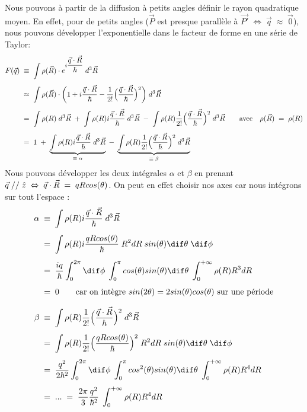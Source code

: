 Nous pouvons à partir de la diffusion à petits angles définir le rayon quadratique moyen. En effet, pour de petits angles ($\vec{P}$ est presque parallèle à $\vec{P'} \; \Leftrightarrow \; \vec{q}\;\approx\;\vec{0}$), nous pouvons développer l'exponentielle dans le facteur de forme en une série de Taylor:
\begin{align*}
    F(\vec{q}) &\;\equiv\;
    \int \rho(\vec{R}) \cdot e^{i\dfrac{\vec{q} \cdot \vec{R}}{\hbar}} \; d^3\vec{R}\\[4pt]
    &\;\approx\;
    \int \rho(\vec{R}) \cdot \bigg( 
    1 + i\dfrac{\vec{q}\cdot\vec{R}}{\hbar} - \dfrac{1}{2!} \Big( \dfrac{\vec{q}\cdot\vec{R}}{\hbar}\Big)^2
    \bigg) \; d^3\vec{R}\\[4pt]
    &\; = \;
    \int \rho(R) \;d^3\vec{R}
    \;+\;
    \int \rho(R)  i\dfrac{\vec{q}\cdot\vec{R}}{\hbar} \; d^3\vec{R}
    \;-\;
    \int \rho(R)  \dfrac{1}{2!} \Big( \dfrac{\vec{q}\cdot\vec{R}}{\hbar}\Big)^2  \; d^3\vec{R}
    \qquad \text{avec} \quad \rho(\vec{R}) \; = \; \rho(R)\\[4pt]
    &\; = \;
    1
    \;+\;
    \underbrace{\int \rho(R)  i\dfrac{\vec{q}\cdot\vec{R}}{\hbar} \; d^3\vec{R}}_{\equiv \; \alpha} 
    \;-\;
    \underbrace{ \int \rho(R)  \dfrac{1}{2!} \Big( \dfrac{\vec{q}\cdot\vec{R}}{\hbar}\Big)^2  \; d^3\vec{R}}_{\equiv \; \beta}
\end{align*}
Nous pouvons développer les deux intégrales $\alpha$ et $\beta$ en prenant $\vec{q}\; \slash{}\slash{}\; \hat{z} \;\Leftrightarrow\; \vec{q}\cdot\vec{R} \; = \; qRcos(\theta)$. On peut en effet choisir nos axes car nous intégrons sur tout l'espace :
\begin{align*}
    \alpha &\;\equiv\;
    \int \rho(R)  i\dfrac{\vec{q}\cdot\vec{R}}{\hbar} \; d^3\vec{R}\\[4pt]
    &\eq
    \int \rho(R)  i\dfrac{qRcos(\theta)}{\hbar} \; R^2dR \;sin(\theta)\dif\theta \; \dif\phi\\[4pt]
    &\eq
    \dfrac{iq}{\hbar} \int_0^{2\pi} \dif\phi \; \int_0^{\pi} cos(\theta) sin(\theta) \dif\theta \;\int_0^{+\infty}\rho(R) R^3 dR \\[4pt]
    &\eq 0 \qquad \text{car on intègre $sin(2\theta)=2sin(\theta)cos(\theta)$ sur une période}
    \\[7pt]
    \beta &\;\equiv\;
    \int \rho(R)  \dfrac{1}{2!} \Big( \dfrac{\vec{q}\cdot\vec{R}}{\hbar}\Big)^2  \; d^3\vec{R}\\[4pt]
    &\eq
    \int \rho(R)  \dfrac{1}{2!} \Big( \dfrac{qRcos(\theta)}{\hbar}\Big)^2  \; R^2dR \;sin(\theta)\dif\theta \; \dif\phi\\[4pt]
    &\eq
    \dfrac{q^2}{2\hbar^2}
    \int_0^{2\pi} \dif\phi \; \int_0^{\pi} cos^2(\theta) sin(\theta) \dif\theta \;\int_0^{+\infty}\rho(R) R^4 dR \\[4pt]
    &\eq ... \eq \dfrac{2\pi}{3}\dfrac{q^2}{\hbar^2} \;\int_0^{+\infty}\rho(R) R^4 dR
\end{align*}
